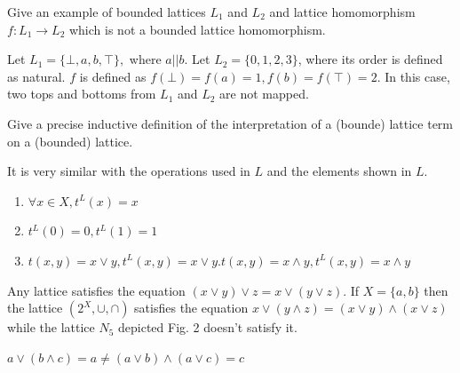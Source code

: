 \documentclass[11pt,a4paper]{exam}
\newcommand{\join}{\vee}
\newcommand{\meet}{\wedge}
\newcommand{\union}{\cup}
\newcommand{\intersection}{\cap}
\begin{document}
\begin{exo}
    Give an example of bounded lattices $L_1$ and $L_2$ and lattice homomorphism $f \colon L_1 \rightarrow L_2$ which is not a bounded lattice homomorphism.

    \begin{sol}
        Let $L_1 = \{\bot, a, b, \top\},$ where $a || b$. Let $L_2 = \{0, 1, 2, 3\}$, where its order is defined as natural. $f$ is defined as $f(\bot) = f(a) = 1, f(b) = f(\top) = 2$. In this case, two tops and bottoms from $L_1$ and $L_2$ are not mapped.
    \end{sol}
\end{exo}

\begin{exo}
    Give a precise inductive definition of the interpretation of a (bounde) lattice term on a (bounded) lattice.

    \begin{sol}
        It is very similar with the operations used in $L$ and the elements shown in $L$.
        \begin{enumerate}
            \item $\forall x \in X, t^L(x) = x$
            \item $t^L(0) = 0, t^L(1) = 1$
            \item $t(x,y) = x \join y, t^L(x,y) = x \join y. t(x,y) = x \meet y, t^L(x,y) = x \meet y$
        \end{enumerate}
    \end{sol}
\end{exo}

\begin{exo}
    Any lattice satisfies the equation $(x \join y) \join z = x \join (y \join z)$. If $X = \{a, b\}$ then the lattice $(2^X, \union, \intersection)$ satisfies the equation $x \join (y \meet z) = (x \join y) \meet (x \join z)$ while the lattice $N_5$ depicted Fig. 2 doesn't satisfy it.

    \begin{sol}
        $a \join (b \meet c) = a \neq (a \join b) \meet (a \join c) = c$
    \end{sol}
\end{exo}
\end{document}
